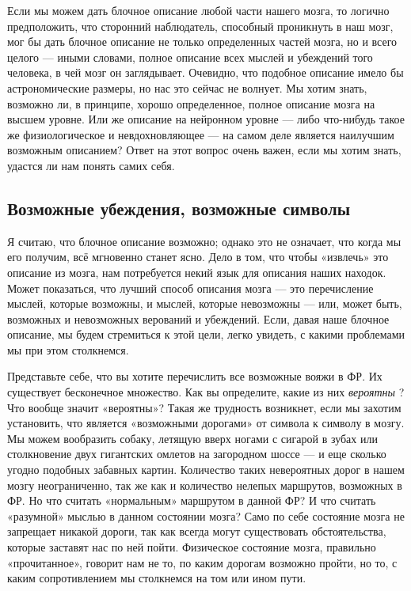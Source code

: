 \documentclass[../main.tex]{subfiles}
\begin{document}
Если мы можем дать блочное описание любой части нашего мозга, то логично предположить, что сторонний наблюдатель, способный проникнуть в наш мозг, мог бы дать блочное описание не только определенных частей мозга, но и всего целого --- иными словами, полное описание всех мыслей и убеждений того человека, в чей мозг он заглядывает. Очевидно, что подобное описание имело бы астрономические размеры, но нас это сейчас не волнует. Мы хотим знать, возможно ли, в принципе, хорошо определенное, полное описание мозга на высшем уровне. Или же описание на нейронном уровне --- либо что-нибудь такое же физиологическое и невдохновляющее --- на самом деле является наилучшим возможным описанием? Ответ на этот вопрос очень важен, если мы хотим знать, удастся ли нам понять самих себя.


\subsection{Возможные убеждения, возможные символы}

Я считаю, что блочное описание возможно; однако это не означает, что когда мы его получим, всё мгновенно станет ясно. Дело в том, что чтобы «извлечь» это описание из мозга, нам потребуется некий язык для описания наших находок. Может показаться, что лучший способ описания мозга --- это перечисление мыслей, которые возможны, и мыслей, которые невозможны --- или, может быть, возможных и невозможных верований и убеждений. Если, давая наше блочное описание, мы будем стремиться к этой цели, легко увидеть, с какими проблемами мы при этом столкнемся.

Представьте себе, что вы хотите перечислить все возможные вояжи в ФР\@. Их существует бесконечное множество. Как вы определите, какие из них \emph{вероятны} ? Что вообще значит «вероятны»? Такая же трудность возникнет, если мы захотим установить, что является «возможными дорогами» от символа к символу в мозгу. Мы можем вообразить собаку, летящую вверх ногами с сигарой в зубах или столкновение двух гигантских омлетов на загородном шоссе --- и еще сколько угодно подобных забавных картин. Количество таких невероятных дорог в нашем мозгу неограниченно, так же как и количество нелепых маршрутов, возможных в ФР\@. Но что считать «нормальным» маршрутом в данной ФР? И что считать «разумной» мыслью в данном состоянии мозга? Само по себе состояние мозга не запрещает никакой дороги, так как всегда могут существовать обстоятельства, которые заставят нас по ней пойти. Физическое состояние мозга, правильно «прочитанное», говорит нам не то, по каким дорогам возможно пройти, но то, с каким сопротивлением мы столкнемся на том или ином пути.
\end{document}
